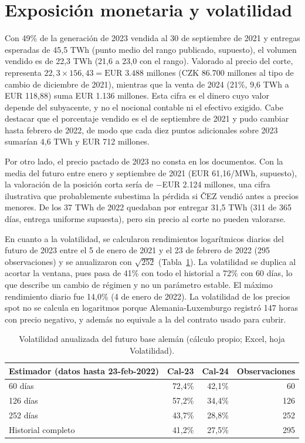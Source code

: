 \documentclass[11pt,letterpaper]{article}
\theoremstyle{plain}
\theoremstyle{definition}
\theoremstyle{remark}
\numberwithin{equation}{section}
\newcommand{\sw}{\begin{singlespace}}
\newcommand{\ew}{\end{singlespace}}
\begin{document}

\section{Exposición monetaria y volatilidad}

Con 49\% de la generación de 2023 vendida al 30 de septiembre de 2021 y entregas esperadas de 45,5 TWh (punto medio del rango publicado, supuesto), el volumen vendido es de 22,3 TWh (21,6 a 23,0 con el rango). Valorado al precio del corte, representa $22{,}3\times156{,}43=\text{EUR }3.488$ millones (CZK 86.700 millones al tipo de cambio de diciembre de 2021), mientras que la venta de 2024 (21\%, 9,6 TWh a EUR 118,88) suma EUR 1.136 millones. Esta cifra es el dinero cuyo valor depende del subyacente, y no el nocional contable ni el efectivo exigido. Cabe destacar que el porcentaje vendido es el de septiembre de 2021 y pudo cambiar hasta febrero de 2022, de modo que cada diez puntos adicionales sobre 2023 sumarían 4,6 TWh y EUR 712 millones.

Por otro lado, el precio pactado de 2023 no consta en los documentos. Con la media del futuro entre enero y septiembre de 2021 (EUR 61,16/MWh, supuesto), la valoración de la posición corta sería de $-$EUR 2.124 millones, una cifra ilustrativa que probablemente subestima la pérdida si ČEZ vendió antes a precios menores. De los 37 TWh de 2022 quedaban por entregar 31,5 TWh (311 de 365 días, entrega uniforme supuesta), pero sin precio al corte no pueden valorarse.

En cuanto a la volatilidad, se calcularon rendimientos logarítmicos diarios del futuro de 2023 entre el 5 de enero de 2021 y el 23 de febrero de 2022 (295 observaciones) y se anualizaron con $\sqrt{252}$ (Tabla~\ref{tab:vol}). La volatilidad se duplica al acortar la ventana, pues pasa de 41\% con todo el historial a 72\% con 60 días, lo que describe un cambio de régimen y no un parámetro estable. El máximo rendimiento diario fue 14,0\% (4 de enero de 2022). La volatilidad de los precios spot no se calcula en logaritmos porque Alemania-Luxemburgo registró 147 horas con precio negativo, y además no equivale a la del contrato usado para cubrir.

\sw
\begin{table}[ht]
	\centering
	\footnotesize
		\begin{tabular}{lrrr}
			\toprule
				Estimador (datos hasta 23-feb-2022) & Cal-23 & Cal-24 & Observaciones \\
			\midrule
				60 días & 72,4\% & 42,1\% & 60 \\
				126 días & 57,2\% & 34,4\% & 126 \\
				252 días & 43,7\% & 28,8\% & 252 \\
				Historial completo & 41,2\% & 27,5\% & 295 \\
			\bottomrule
		\end{tabular}
	\caption{Volatilidad anualizada del futuro base alemán (cálculo propio; Excel, hoja Volatilidad).}
	\label{tab:vol}
\end{table}
\ew
\end{document}
